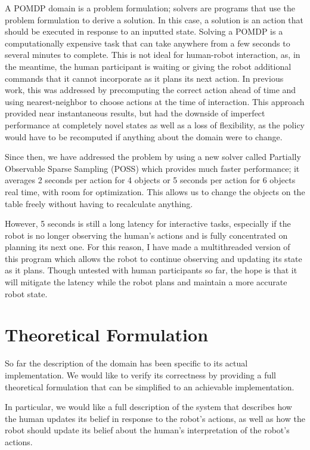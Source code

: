 \documentclass{article}
\begin{document}
A POMDP domain is a problem formulation; solvers are programs that use the problem formulation to derive a solution. In this case, a solution is an action that should be executed in response to an inputted state. Solving a POMDP is a computationally expensive task that can take anywhere from a few seconds to several minutes to complete. This is not ideal for human-robot interaction, as, in the meantime, the human participant is waiting or giving the robot additional commands that it cannot incorporate as it plans its next action. In previous work, this was addressed by precomputing the correct action ahead of time and using nearest-neighbor to choose actions at the time of interaction. This approach provided near instantaneous results, but had the downside of imperfect performance at completely novel states as well as a loss of flexibility, as the policy would have to be recomputed if anything about the domain were to change. 

Since then, we have addressed the problem by using a new solver called Partially Observable Sparse Sampling (POSS) which provides much faster performance; it averages 2 seconds per action for 4 objects or 5 seconds per action for 6 objects real time, with room for optimization. This allows us to change the objects on the table freely without having to recalculate anything. 

However, 5 seconds is still a long latency for interactive tasks, especially if the robot is no longer observing the human's actions and is fully concentrated on planning its next one. For this reason, I have made a multithreaded version of this program which allows the robot to continue observing and updating its state as it plans. Though untested with human participants so far, the hope is that it will mitigate the latency while the robot plans and maintain a more accurate robot state. 


\section{Theoretical Formulation}

So far the description of the domain has been specific to its actual implementation. We would like to verify its correctness by providing a full theoretical formulation that can be simplified to an achievable implementation. 

In particular, we would like a full description of the system that describes how the human updates its belief in response to the robot's actions, as well as how the robot should update its belief about the human's interpretation of the robot's actions. 
\end{document}
